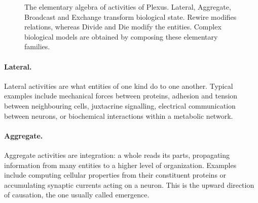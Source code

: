 \documentclass[11pt]{article}
\begin{document}
\begin{figure}[h]
{}
\caption{
The elementary algebra of activities of Plexus. Lateral, Aggregate, Broadcast and
Exchange transform biological state. Rewire modifies relations, whereas Divide and
Die modify the entities. Complex biological models are obtained by composing these
elementary families.
}
\label{fig:ops}
\end{figure}

\paragraph{Lateral.}
Lateral activities are what entities of one kind do to one another. Typical examples
include mechanical forces between proteins, adhesion and tension between neighbouring
cells, juxtacrine signalling, electrical communication between neurons, or biochemical
interactions within a metabolic network.

\paragraph{Aggregate.}
Aggregate activities are integration: a whole reads its parts, propagating information
from many entities to a higher level of organization. Examples include computing
cellular properties from their constituent proteins or accumulating synaptic currents
acting on a neuron. This is the upward direction of causation, the one usually called
emergence.
\end{document}
